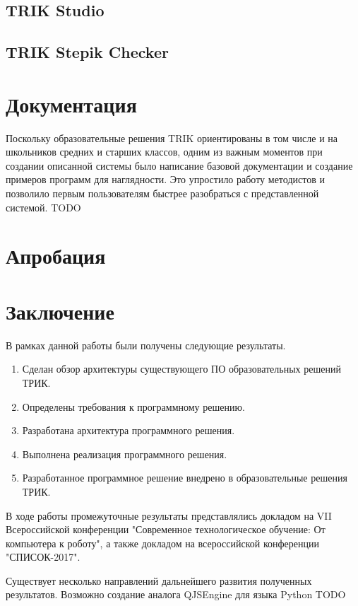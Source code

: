 \documentclass[14pt]{matmex-diploma-custom}
\begin{document}
\subsection{TRIK Studio}

\subsection{TRIK Stepik Checker}



\section{Документация}
Поскольку образовательные решения TRIK ориентированы в том числе и на школьников средних и старших классов, одним из важным моментов при создании описанной системы было написание базовой документации и создание примеров программ для наглядности. Это упростило работу методистов и позволило первым пользователям быстрее разобраться с представленной системой. TODO

\section{Апробация}


\section*{Заключение}

В рамках данной работы были получены следующие результаты.
\begin{enumerate}
\item Сделан обзор архитектуры существующего ПО образовательных решений ТРИК.
\item Определены требования к программному решению.
\item Разработана архитектура программного решения.
\item Выполнена реализация программного решения.
\item Разработанное программное решение внедрено в образовательные решения ТРИК.
\end{enumerate}



В ходе работы промежуточные результаты представлялись докладом на VII Всероссийской конференции "Современное технологическое обучение: От компьютера к роботу", а также докладом на всероссийской конференции "СПИСОК-2017".

Существует несколько направлений дальнейшего развития полученных результатов. Возможно создание аналога QJSEngine для языка Python TODO

\setmonofont[Mapping=tex-text]{CMU Typewriter Text}


\end{document}
